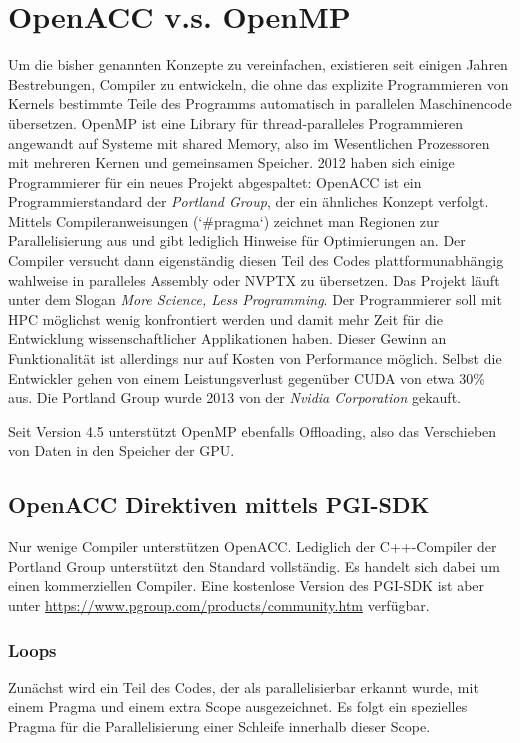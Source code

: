 	\chapter{OpenACC v.s. OpenMP}
	Um die bisher genannten Konzepte zu vereinfachen, existieren seit einigen Jahren Bestrebungen, Compiler zu entwickeln, die ohne das explizite Programmieren von \Glspl{Kernel} bestimmte Teile des Programms automatisch in parallelen Maschinencode übersetzen. OpenMP ist eine Library für thread-paralleles Programmieren angewandt auf Systeme mit shared Memory, also im Wesentlichen Prozessoren mit mehreren Kernen und gemeinsamen Speicher. 2012 haben sich einige Programmierer für ein neues Projekt abgespaltet: OpenACC ist ein Programmierstandard der \textit{Portland Group}, der ein ähnliches Konzept verfolgt. Mittels Compileranweisungen (\li`#pragma`) zeichnet man Regionen zur Parallelisierung aus und gibt lediglich Hinweise für Optimierungen an. Der Compiler versucht dann eigenständig diesen Teil des Codes plattformunabhängig wahlweise in paralleles Assembly oder \Gls{NVPTX} zu übersetzen. Das Projekt läuft unter dem Slogan \textit{More Science, Less Programming}. Der Programmierer soll mit HPC möglichst wenig konfrontiert werden und damit mehr Zeit für die Entwicklung wissenschaftlicher Applikationen haben. Dieser Gewinn an Funktionalität ist allerdings nur auf Kosten von Performance möglich. Selbst die Entwickler gehen von einem Leistungsverlust gegenüber CUDA von etwa 30\% aus. Die Portland Group wurde 2013 von der \textit{Nvidia Corporation} gekauft.
	
	Seit Version 4.5 unterstützt OpenMP ebenfalls Offloading, also das Verschieben von Daten in den Speicher der GPU.
	 
		\section{OpenACC Direktiven mittels PGI-SDK}
		Nur wenige Compiler unterstützen OpenACC. Lediglich der C++-Compiler der Portland Group unterstützt den Standard vollständig. Es handelt sich dabei um einen kommerziellen Compiler. Eine kostenlose Version des PGI-SDK ist aber unter \url{https://www.pgroup.com/products/community.htm} verfügbar.
		
			\subsection{Loops}
			Zunächst wird ein Teil des Codes, der als parallelisierbar erkannt wurde, mit einem Pragma und einem extra Scope ausgezeichnet. Es folgt ein spezielles Pragma für die Parallelisierung einer Schleife innerhalb dieser Scope. 
			
